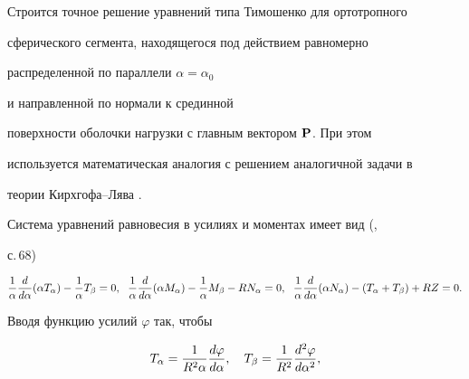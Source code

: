  


\pagestyle{plain} %


 


 




 


\maketitle 


\label{begin} 


 


Строится точное решение уравнений типа Тимошенко для ортотропного 


сферического сегмента, находящегося под действием равномерно 


распределенной по параллели $\alpha=\alpha_0$ 


и направленной по нормали к срединной 


поверхности оболочки нагрузки с главным вектором $\bold P$. При этом 


используется математическая аналогия с решением аналогичной задачи в 


теории Кирхгофа--Лява \cite{1}. 


 


Система уравнений равновесия в усилиях и моментах имеет вид (\cite{2}, 


с.\,68) 


\begin{equation} 


\frac{1}{\alpha}\myfrac{}{}(\alpha T_\alpha)- 


\frac{1}{\alpha}T_\beta=0,\ \;


\frac{1}{\alpha}\myfrac{}{}(\alpha M_\alpha)- 


\frac{1}{\alpha}M_\beta-R N_\alpha=0,\ \;


\frac{1}{\alpha}\myfrac{}{}(\alpha N_\alpha)-(T_\alpha+T_\beta)+R Z=0. 


\end{equation} 


Вводя функцию усилий $\varphi$ так, чтобы 


\begin{equation} 


T_\alpha=\frac{1}{R^2\alpha}\frac{d \varphi}{d\alpha},\quad 


T_\beta=\frac{1}{R^2}\myfrac{^2\varphi}{^2}, 


\end{equation} 


